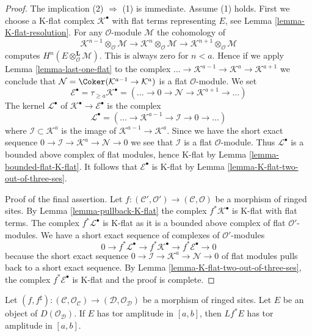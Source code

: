 \begin{proof}
The implication (2) $\Rightarrow$ (1) is immediate. Assume (1) holds.
First we choose a K-flat complex $\mathcal{K}^\bullet$
with flat terms representing $E$, see Lemma \ref{lemma-K-flat-resolution}.
For any $\mathcal{O}$-module $\mathcal{M}$ the cohomology of
$$
\mathcal{K}^{n - 1} \otimes_\mathcal{O} \mathcal{M} \to
\mathcal{K}^n \otimes_\mathcal{O} \mathcal{M} \to
\mathcal{K}^{n + 1} \otimes_\mathcal{O} \mathcal{M}
$$
computes $H^n(E \otimes_\mathcal{O}^\mathbf{L} \mathcal{M})$.
This is always zero for $n < a$. Hence if we apply
Lemma \ref{lemma-last-one-flat} to the complex
$\ldots \to \mathcal{K}^{a - 1} \to \mathcal{K}^a \to \mathcal{K}^{a + 1}$
we conclude that $\mathcal{N} = \Coker(\mathcal{K}^{a - 1} \to \mathcal{K}^a)$
is a flat $\mathcal{O}$-module. We set
$$
\mathcal{E}^\bullet = \tau_{\geq a}\mathcal{K}^\bullet =
(\ldots \to 0 \to \mathcal{N} \to \mathcal{K}^{a + 1} \to \ldots )
$$
The kernel $\mathcal{L}^\bullet$ of
$\mathcal{K}^\bullet \to \mathcal{E}^\bullet$ is the complex
$$
\mathcal{L}^\bullet = (\ldots \to \mathcal{K}^{a - 1} \to
\mathcal{I} \to 0 \to \ldots)
$$
where $\mathcal{I} \subset \mathcal{K}^a$ is the image of
$\mathcal{K}^{a - 1} \to \mathcal{K}^a$.
Since we have the short exact sequence
$0 \to \mathcal{I} \to \mathcal{K}^a \to \mathcal{N} \to 0$
we see that $\mathcal{I}$ is a flat $\mathcal{O}$-module.
Thus $\mathcal{L}^\bullet$ is a bounded
above complex of flat modules, hence K-flat by
Lemma \ref{lemma-bounded-flat-K-flat}.
It follows that $\mathcal{E}^\bullet$ is K-flat by
Lemma \ref{lemma-K-flat-two-out-of-three-ses}.

\medskip\noindent
Proof of the final assertion. Let
$f : (\mathcal{C}', \mathcal{O}') \to (\mathcal{C}, \mathcal{O})$
be a morphism of ringed sites. By Lemma \ref{lemma-pullback-K-flat}
the complex $f^*\mathcal{K}^\bullet$ is K-flat with flat terms.
The complex $f^*\mathcal{L}^\bullet$ is K-flat as it is a bounded
above complex of flat $\mathcal{O}'$-modules. We have a short exact
sequence of complexes of $\mathcal{O}'$-modules
$$
0 \to f^*\mathcal{L}^\bullet \to f^*\mathcal{K}^\bullet \to
f^*\mathcal{E}^\bullet \to 0
$$
because the short exact sequence
$0 \to \mathcal{I} \to \mathcal{K}^a \to \mathcal{N} \to 0$
of flat modules pulls back to a short exact sequence.
By Lemma \ref{lemma-K-flat-two-out-of-three-ses},
the complex $f^*\mathcal{E}^\bullet$ is K-flat and the proof is complete.
\end{proof}

\begin{lemma}
\label{lemma-tor-amplitude-pullback}
Let $(f, f^\sharp) : (\mathcal{C}, \mathcal{O}_\mathcal{C}) \to
(\mathcal{D}, \mathcal{O}_\mathcal{D})$
be a morphism of ringed sites.
Let $E$ be an object of $D(\mathcal{O}_\mathcal{D})$.
If $E$ has tor amplitude in $[a, b]$,
then $Lf^*E$ has tor amplitude in $[a, b]$.
\end{lemma}

